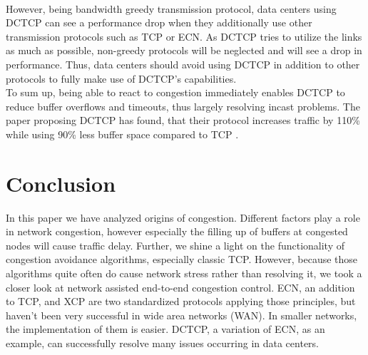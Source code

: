 \documentclass[a4paper,conference]{IEEEtran}
\begin{document}
\\However, being bandwidth greedy transmission protocol, data centers using DCTCP can see a performance drop when they additionally use other transmission protocols such as TCP or ECN. As DCTCP tries to utilize the links as much as possible, non-greedy protocols will be neglected and will see a drop in performance. Thus, data centers should avoid using DCTCP in addition to other protocols to fully make use of DCTCP's capabilities.
\\To sum up, being able to react to congestion immediately enables DCTCP to reduce buffer overflows and timeouts, thus largely resolving incast problems. The paper proposing DCTCP has found, that their protocol increases traffic by 110\% while using 90\% less buffer space compared to TCP \cite{10.1145/1851275.1851192}.

\section{Conclusion}
In this paper we have analyzed origins of congestion. Different factors play a role in network congestion, however especially the filling up of buffers at congested nodes will cause traffic delay. Further, we shine a light on the functionality of congestion avoidance algorithms, especially classic TCP. However, because those algorithms quite often do cause network stress rather than resolving it, we took a closer look at network assisted end-to-end congestion control. ECN, an addition to TCP, and XCP are two standardized protocols applying those principles, but haven't been very successful in wide area networks (WAN). In smaller networks, the implementation of them is easier. DCTCP, a variation of ECN, as an example, can successfully resolve many issues occurring in data centers.


\end{document}
